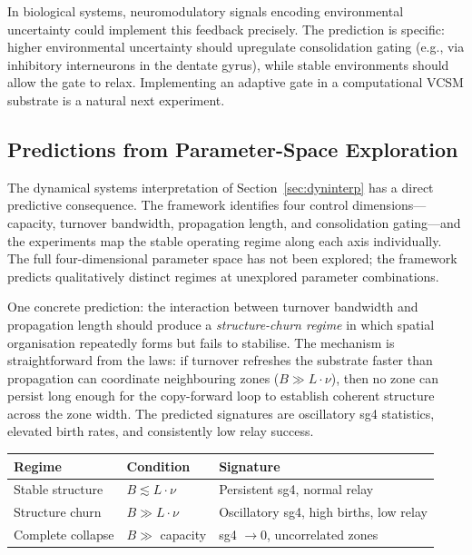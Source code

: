\documentclass[11pt]{article}
\begin{document}
In biological systems, neuromodulatory signals encoding environmental uncertainty could implement this feedback precisely. The prediction is specific: higher environmental uncertainty should upregulate consolidation gating (e.g., via inhibitory interneurons in the dentate gyrus), while stable environments should allow the gate to relax. Implementing an adaptive gate in a computational VCSM substrate is a natural next experiment.

\subsection{Predictions from Parameter-Space Exploration}
\label{sec:predictions}

The dynamical systems interpretation of Section~\ref{sec:dyninterp} has a direct predictive consequence. The framework identifies four control dimensions---capacity, turnover bandwidth, propagation length, and consolidation gating---and the experiments map the stable operating regime along each axis individually. The full four-dimensional parameter space has not been explored; the framework predicts qualitatively distinct regimes at unexplored parameter combinations.

One concrete prediction: the interaction between turnover bandwidth and propagation length should produce a \emph{structure-churn regime} in which spatial organisation repeatedly forms but fails to stabilise. The mechanism is straightforward from the laws: if turnover refreshes the substrate faster than propagation can coordinate neighbouring zones ($B \gg L \cdot \nu$), then no zone can persist long enough for the copy-forward loop to establish coherent structure across the zone width. The predicted signatures are oscillatory sg4 statistics, elevated birth rates, and consistently low relay success.

\begin{center}
\begin{tabular}{lll}
\toprule
\textbf{Regime} & \textbf{Condition} & \textbf{Signature} \\
\midrule
Stable structure  & $B \lesssim L \cdot \nu$ & Persistent sg4, normal relay \\
Structure churn   & $B \gg L \cdot \nu$      & Oscillatory sg4, high births, low relay \\
Complete collapse & $B \gg $ capacity         & sg4 $\to 0$, uncorrelated zones \\
\bottomrule
\end{tabular}
\end{center}
\end{document}
